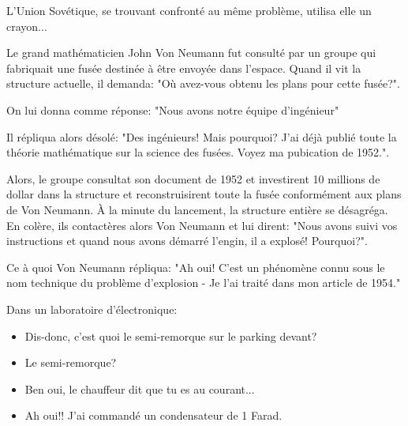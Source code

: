 	L'Union Sovétique, se trouvant confronté au même problème, utilisa elle un crayon...

	\begin{center}\underline{\hspace{5 cm}}\end{center}
	
	Le grand mathématicien John Von Neumann fut consulté par un groupe qui fabriquait une fusée destinée à être envoyée dans l'espace. Quand il vit la structure actuelle, il demanda: "Où avez-vous obtenu les plans pour cette fusée?".

	On lui donna comme réponse: "Nous avons notre équipe d'ingénieur"

	Il répliqua alors désolé: "Des ingénieurs! Mais pourquoi? J'ai déjà publié toute la théorie mathématique sur la science des fusées. Voyez ma pubication de 1952.".

	Alors, le groupe consultat son document de 1952 et investirent 10 millions de dollar dans la structure et reconstruisirent toute la fusée conformément aux plans de Von Neumann. À la minute du lancement, la structure entière se désagréga. En colère, ils contactères alors Von Neumann et lui dirent: "Nous avons suivi vos instructions et quand nous avons démarré l'engin, il a explosé! Pourquoi?".

	Ce à quoi Von Neumann répliqua: "Ah oui! C'est un phénomène connu sous le nom technique du problème d'explosion - Je l'ai traité dans mon article de 1954."

	\begin{center}\underline{\hspace{5 cm}}\end{center}
	
	Dans un laboratoire d'électronique:
	
	\begin{itemize}
		\item Dis-donc, c'est quoi le semi-remorque sur le parking devant?
	
		\item Le semi-remorque?
	
		\item Ben oui, le chauffeur dit que tu es au courant...
	
		\item Ah oui!! J'ai commandé un condensateur de 1 Farad.
	\end{itemize}

	\begin{center}\underline{\hspace{5 cm}}\end{center}
	
